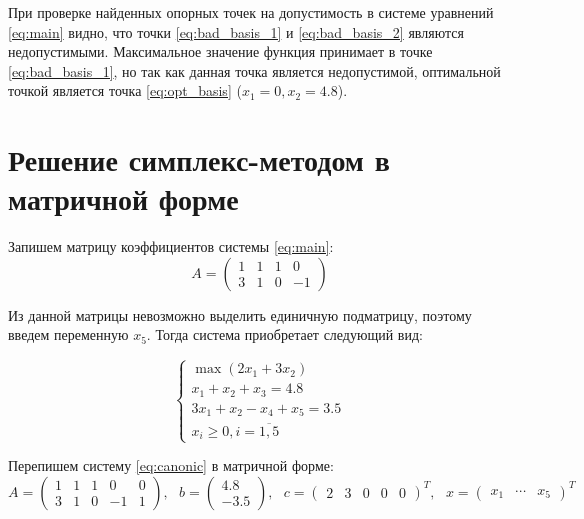 При проверке найденных опорных точек на допустимость в системе уравнений \ref{eq:main} видно, что точки \ref{eq:bad_basis_1} и \ref{eq:bad_basis_2} являются недопустимыми. Максимальное значение функция принимает в точке \ref{eq:bad_basis_1}, но так как данная точка является недопустимой, оптимальной точкой является точка \ref{eq:opt_basis} ($x_1 = 0, x_2 = 4.8$).

\section{Решение симплекс-методом в матричной форме}

Запишем матрицу коэффициентов системы \ref{eq:main}:
\begin{equation*}
A = 
\begin{pmatrix}
	1 & 1 & 1 & 0 \\
	3 & 1 & 0 & -1
\end{pmatrix}
\end{equation*}

Из данной матрицы невозможно выделить единичную подматрицу, поэтому введем переменную $x_5$. Тогда система приобретает следующий вид:

\begin{equation}
\label{eq:canonic}
\begin{cases}
	\max \left( 2 x_1 + 3 x_2 \right) \\
	x_1 + x_2 + x_3 = 4.8 \\
	3 x_1 + x_2 - x_4 + x_5 = 3.5 \\
	x_i \ge 0, i = \overline{1,5}
\end{cases}
\end{equation}

Перепишем систему \ref{eq:canonic} в матричной форме:
\begin{equation*}
A = 
\begin{pmatrix}
	1 & 1 & 1 & 0 & 0\\
	3 & 1 & 0 & -1 & 1
\end{pmatrix},\text{ }
b = 
\begin{pmatrix}
	4.8 \\
	-3.5
\end{pmatrix},\text{ }
c = 
\begin{pmatrix}
	2 & 3 & 0 & 0 & 0
\end{pmatrix}^T,\text{ }
x = 
\begin{pmatrix}
	x_1 & \cdots & x_5 
\end{pmatrix}^T
\end{equation*}

